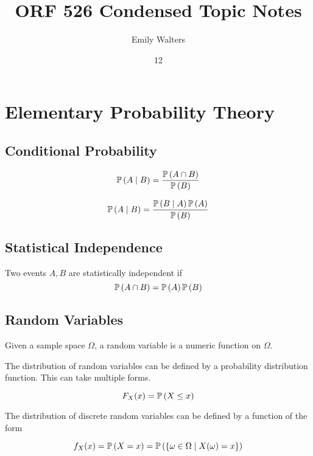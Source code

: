 \documentclass[english, course]{Notes}
\title{ORF 526 Condensed Topic Notes}
\author{Emily Walters}
\date{12}{09}{2018}
\begin{document}
	
\section{Elementary Probability Theory}

\subsection{Conditional Probability}

\begin{definition}
\[\mathbb{P}\left(A \mid B\right) = \frac{\mathbb{P}\left(A \cap B\right)}{\mathbb{P}\left(B\right)} \]
\end{definition}

\begin{theorem}
\[\mathbb{P}\left(A \mid B\right) = \frac{\mathbb{P}\left(B \mid A\right) \mathbb{P}\left(A\right)}{\mathbb{P}\left(B\right)}\]
\end{theorem}
\subsection{Statistical Independence}

\begin{definition}
Two events $A, B$ are statistically independent if
\[\mathbb{P}\left(A \cap B\right) = \mathbb{P}\left(A\right) \mathbb{P}\left(B\right)\]
\end{definition}


\subsection{Random Variables}

\begin{definition}
Given a sample space $\Omega$, a random variable is a numeric function on $\Omega$.
\end{definition}

The distribution of random variables can be defined by a probability distribution function. This can take multiple forms.

\begin{definition}
\[F_X(x) = \mathbb{P}\left(X \leq x\right)\]
\end{definition}

\begin{definition}
The distribution of discrete random variables can be defined by a function of the form

\[f_X(x) = \mathbb{P}\left(X = x\right) = \mathbb{P}\left(\{\omega \in \Omega \mid X(\omega) = x\}\right)\]
\end{definition}
\end{document}
